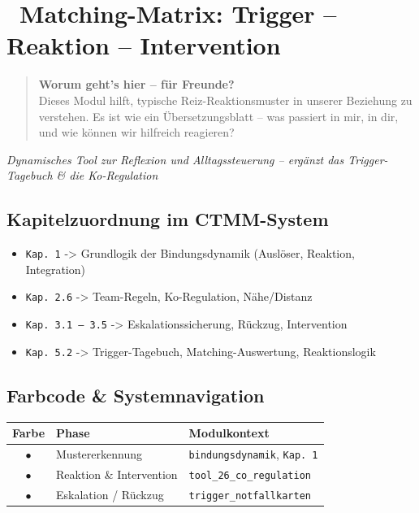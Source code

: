 
\section*{\textcolor{ctmmPurple}{\faPuzzlePiece~Matching-Matrix: Trigger -- Reaktion -- Intervention}}

\begin{quote}
\textbf{\textcolor{ctmmPurple}{Worum geht's hier -- für Freunde?}}\\
Dieses Modul hilft, typische Reiz-Reaktionsmuster in unserer Beziehung zu verstehen. Es ist wie ein Übersetzungsblatt -- was passiert in mir, in dir, und wie können wir hilfreich reagieren?
\end{quote}

\textit{Dynamisches Tool zur Reflexion und Alltagssteuerung -- ergänzt das Trigger-Tagebuch \& die Ko-Regulation}

\subsection*{\textcolor{ctmmPurple}{Kapitelzuordnung im CTMM-System}}

\begin{itemize}
  \item \texttt{Kap. 1} -> Grundlogik der Bindungsdynamik (Auslöser, Reaktion, Integration)
  \item \texttt{Kap. 2.6} -> Team-Regeln, Ko-Regulation, Nähe/Distanz
  \item \texttt{Kap. 3.1 -- 3.5} -> Eskalationssicherung, Rückzug, Intervention
  \item \texttt{Kap. 5.2} -> Trigger-Tagebuch, Matching-Auswertung, Reaktionslogik
\end{itemize}

\subsection*{\textcolor{ctmmPurple}{Farbcode \& Systemnavigation}}

\begin{center}
\begin{tabular}{|c|l|l|}
\hline
\textbf{Farbe} & \textbf{Phase} & \textbf{Modulkontext} \\
\hline
\textcolor{ctmmBlue}{$\bullet$} & Mustererkennung & \texttt{bindungsdynamik}, \texttt{Kap. 1} \\
\textcolor{ctmmOrange}{$\bullet$} & Reaktion \& Intervention & \texttt{tool\_26\_co\_regulation} \\
\textcolor{ctmmRed}{$\bullet$} & Eskalation / Rückzug & \texttt{trigger\_notfallkarten} \\
\hline
\end{tabular}
\end{center}

